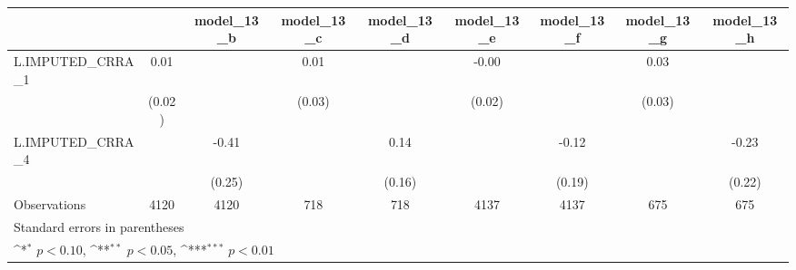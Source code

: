 {
\def\sym#1{\ifmmode^{#1}\else\(^{#1}\)\fi}
\begin{tabular}{l*{8}{c}}
\toprule
                &\multicolumn{1}{c}{}&\multicolumn{1}{c}{model\_13\_b}&\multicolumn{1}{c}{model\_13\_c}&\multicolumn{1}{c}{model\_13\_d}&\multicolumn{1}{c}{model\_13\_e}&\multicolumn{1}{c}{model\_13\_f}&\multicolumn{1}{c}{model\_13\_g}&\multicolumn{1}{c}{model\_13\_h}\\
\midrule
L.IMPUTED\_CRRA\_1&     0.01         &                  &     0.01         &                  &    -0.00         &                  &     0.03         &                  \\
                &   (0.02)         &                  &   (0.03)         &                  &   (0.02)         &                  &   (0.03)         &                  \\
\addlinespace
L.IMPUTED\_CRRA\_4&                  &    -0.41         &                  &     0.14         &                  &    -0.12         &                  &    -0.23         \\
                &                  &   (0.25)         &                  &   (0.16)         &                  &   (0.19)         &                  &   (0.22)         \\
\midrule
Observations    &     4120         &     4120         &      718         &      718         &     4137         &     4137         &      675         &      675         \\
\bottomrule
\multicolumn{9}{l}{\footnotesize Standard errors in parentheses}\\
\multicolumn{9}{l}{\footnotesize \sym{*} \(p<0.10\), \sym{**} \(p<0.05\), \sym{***} \(p<0.01\)}\\
\end{tabular}
}

